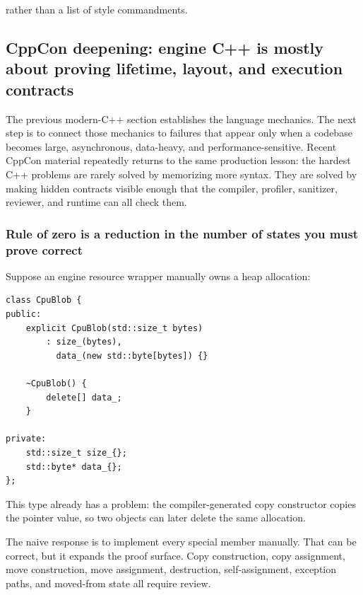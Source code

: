 rather than a list of style commandments.

\subsection{CppCon deepening: engine C++ is mostly about proving lifetime, layout, and execution contracts}\label{01-foundations-i-ch005-cppcon-deepening-engine-c-is-mostly-about-proving-lifetime-layout-and-execution-contracts}

\hypertarget{01-foundations-i-ch005-cppcon-deepening-engine-c-is-mostly-about-proving-lifetime-layout-and-execution-contracts}{}

The previous modern-C++ section establishes the language mechanics. The next step is to connect those mechanics to failures that appear only when a codebase becomes large, asynchronous, data-heavy, and performance-sensitive. Recent CppCon material repeatedly returns to the same production lesson: the hardest C++ problems are rarely solved by memorizing more syntax. They are solved by making hidden contracts visible enough that the compiler, profiler, sanitizer, reviewer, and runtime can all check them.

\subsubsection{Rule of zero is a reduction in the number of states you must prove correct}\label{01-foundations-i-ch005-rule-of-zero-is-a-reduction-in-the-number-of-states-you-must-prove-correct}

\hypertarget{01-foundations-i-ch005-rule-of-zero-is-a-reduction-in-the-number-of-states-you-must-prove-correct}{}

Suppose an engine resource wrapper manually owns a heap allocation:

\begin{verbatim}
class CpuBlob {
public:
    explicit CpuBlob(std::size_t bytes)
        : size_(bytes),
          data_(new std::byte[bytes]) {}

    ~CpuBlob() {
        delete[] data_;
    }

private:
    std::size_t size_{};
    std::byte* data_{};
};
\end{verbatim}

This type already has a problem: the compiler-generated copy constructor copies the pointer value, so two objects can later delete the same allocation.

The naive response is to implement every special member manually. That can be correct, but it expands the proof surface. Copy construction, copy assignment, move construction, move assignment, destruction, self-assignment, exception paths, and moved-from state all require review.

